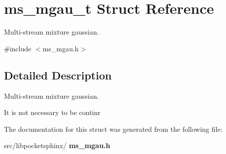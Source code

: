 \section{ms\+\_\+mgau\+\_\+t Struct Reference}
\label{structms__mgau__t}


Multi-\/stream mixture gaussian.  




{\ttfamily \#include $<$ms\+\_\+mgau.\+h$>$}



\subsection{Detailed Description}
Multi-\/stream mixture gaussian. 

It is not necessary to be continr 

The documentation for this struct was generated from the following file\+:\begin{DoxyCompactItemize}
\item 
src/libpocketsphinx/\textbf{ ms\+\_\+mgau.\+h}\end{DoxyCompactItemize}
